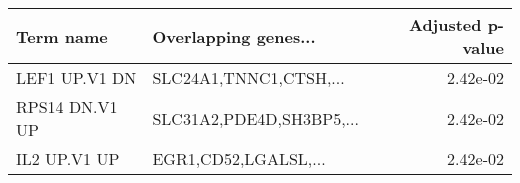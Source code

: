 \begin{tabular}{llr}
\toprule
     Term name &     Overlapping genes... &  Adjusted p-value \\
\midrule
 LEF1 UP.V1 DN &   SLC24A1,TNNC1,CTSH,... &          2.42e-02 \\
RPS14 DN.V1 UP & SLC31A2,PDE4D,SH3BP5,... &          2.42e-02 \\
  IL2 UP.V1 UP &     EGR1,CD52,LGALSL,... &          2.42e-02 \\
\bottomrule
\end{tabular}
